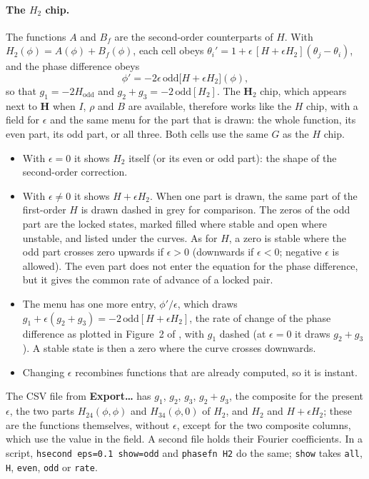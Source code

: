 \documentclass[11pt,a4paper]{article}
\newcommand{\ui}[1]{\textsf{\textbf{#1}}}          %
\begin{document}
\paragraph{The $H_2$ chip.} The functions $A$ and $B_f$ are the second-order counterparts of $H$. With $H_2(\phi)=A(\phi)+B_f(\phi)$, each cell obeys $\theta_i'=1+\epsilon\,[H+\epsilon H_2](\theta_j-\theta_i)$, and the phase difference obeys
\begin{equation}
  \phi'=-2\epsilon\,\mathrm{odd}\bigl[H+\epsilon H_2\bigr](\phi),
\end{equation}
so that $g_1=-2H_{\mathrm{odd}}$ and $g_2+g_3=-2\,\mathrm{odd}[H_2]$. The \ui{H$_2$} chip, which appears next to \ui{H} when $I$, $\rho$ and $B$ are available, therefore works like the $H$ chip, with a field for $\epsilon$ and the same menu for the part that is drawn: the whole function, its even part, its odd part, or all three. Both cells use the same $G$ as the $H$ chip.
\begin{itemize}
  \item With $\epsilon=0$ it shows $H_2$ itself (or its even or odd part): the shape of the second-order correction.
  \item With $\epsilon\neq0$ it shows $H+\epsilon H_2$. When one part is drawn, the same part of the first-order $H$ is drawn dashed in grey for comparison. The zeros of the odd part are the locked states, marked filled where stable and open where unstable, and listed under the curves. As for $H$, a zero is stable where the odd part crosses zero upwards if $\epsilon>0$ (downwards if $\epsilon<0$; negative $\epsilon$ is allowed). The even part does not enter the equation for the phase difference, but it gives the common rate of advance of a locked pair.
  \item The menu has one more entry, $\phi'/\epsilon$, which draws $g_1+\epsilon(g_2+g_3)=-2\,\mathrm{odd}[H+\epsilon H_2]$, the rate of change of the phase difference as plotted in Figure~2 of \cite{wilson2019}, with $g_1$ dashed (at $\epsilon=0$ it draws $g_2+g_3$). A stable state is then a zero where the curve crosses downwards.
  \item Changing $\epsilon$ recombines functions that are already computed, so it is instant.
\end{itemize}
The CSV file from \ui{Export\ldots} has $g_1$, $g_2$, $g_3$, $g_2+g_3$, the composite for the present $\epsilon$, the two parts $H_{24}(\phi,\phi)$ and $H_{34}(\phi,0)$ of $H_2$, and $H_2$ and $H+\epsilon H_2$; these are the functions themselves, without $\epsilon$, except for the two composite columns, which use the value in the field. A second file holds their Fourier coefficients. In a script, \texttt{hsecond eps=0.1 show=odd} and \texttt{phasefn H2} do the same; \texttt{show} takes \texttt{all}, \texttt{H}, \texttt{even}, \texttt{odd} or \texttt{rate}.
\end{document}
